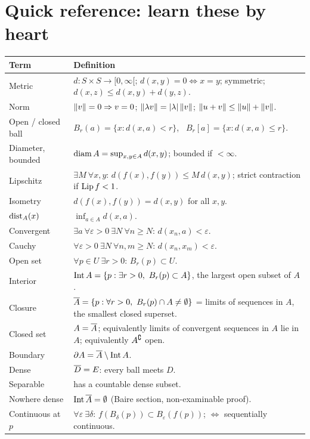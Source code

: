 \section{Quick reference: learn these by heart}

\begin{center}
\renewcommand{\arraystretch}{1.25}
\begin{longtable}{@{}p{3.4cm}p{12.6cm}@{}}\toprule
Term & Definition\\\midrule
Metric & $d:S\times S\to[0,\infty[$; $d(x,y)=0\iff x=y$; symmetric; $d(x,z)\le d(x,y)+d(y,z)$.\\
Norm & $\left\lVert v\right\rVert=0\Rightarrow v=0$; $\left\lVert\lambda v\right\rVert=|\lambda|\left\lVert v\right\rVert$; $\left\lVert u+v\right\rVert\le\left\lVert u\right\rVert+\left\lVert v\right\rVert$.\\
Open / closed ball & $B_r(a)=\{x:d(x,a)<r\}$, \ $B_r[a]=\{x:d(x,a)\le r\}$.\\
Diameter, bounded & $\operatorname{diam} A=\sup_{x,y\in A}d(x,y)$; bounded if $<\infty$.\\
Lipschitz & $\exists M\ \forall x,y$: $d(f(x),f(y))\le M\,d(x,y)$; strict contraction if $\operatorname{Lip} f<1$.\\
Isometry & $d(f(x),f(y))=d(x,y)$ for all $x,y$.\\
$\operatorname{dist}_A(x)$ & $\inf_{a\in A}d(x,a)$.\\
Convergent & $\exists a\ \forall\varepsilon>0\ \exists N\ \forall n\ge N$: $d(x_n,a)<\varepsilon$.\\
Cauchy & $\forall\varepsilon>0\ \exists N\ \forall n,m\ge N$: $d(x_n,x_m)<\varepsilon$.\\
Open set & $\forall p\in U\ \exists r>0$: $B_r(p)\subset U$.\\
Interior & $\operatorname{Int} A=\{p:\exists r>0,\ B_r(p)\subset A\}$, the largest open subset of $A$.\\
Closure & $\overline{A}=\{p:\forall r>0,\ B_r(p)\cap A\ne\emptyset\}$ = limits of sequences in $A$, the smallest closed superset.\\
Closed set & $A=\overline{A}$; equivalently limits of convergent sequences in $A$ lie in $A$; equivalently $A^{\complement}$ open.\\
Boundary & $\partial A=\overline{A}\setminus\operatorname{Int} A$.\\
Dense & $\overline{D}=E$: every ball meets $D$.\\
Separable & has a countable dense subset.\\
Nowhere dense & $\operatorname{Int}\overline{A}=\emptyset$ (Baire section, non-examinable proof).\\
Continuous at $p$ & $\forall\varepsilon\ \exists\delta$: $f(B_\delta(p))\subset B_\varepsilon(f(p))$; $\iff$ sequentially continuous.\\

\end{longtable}
\end{center}
